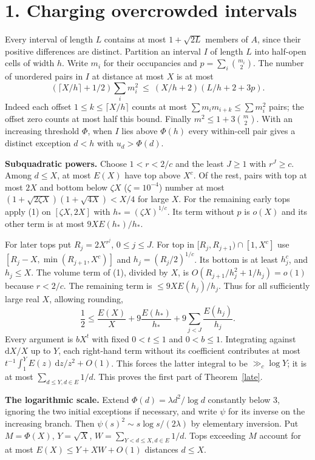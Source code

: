 \documentclass[10pt,a4paper]{article}
\newcommand{\rd}{\mathrm d}
\begin{document}
\section*{1. Charging overcrowded intervals}
Every interval of length $L$ contains at most $1+\sqrt{2L}$ members of $A$, since their positive differences are distinct. Partition an interval $I$ of length $L$ into half-open cells of width $h$. Write $m_i$ for their occupancies and $p=\sum_i\binom{m_i}{2}$. The number of unordered pairs in $I$ at distance at most $X$ is at most
\begin{equation}
 (\lceil X/h\rceil+1/2)\sum_i m_i^2
 \ \le\ (X/h+2)(L/h+2+3p).                                      \tag{1}
\end{equation}
Indeed each offset $1\le k\le\lceil X/h\rceil$ counts at most $\sum m_i m_{i+k}\le\sum m_i^2$ pairs; the offset zero counts at most half this bound. Finally $m^2\le1+3\binom m2$. With an increasing threshold $\Phi$, when $I$ lies above $\Phi(h)$ every within-cell pair gives a distinct exception $d<h$ with $u_d>\Phi(d)$.

\textbf{Subquadratic powers.} Choose $1<r<2/c$ and the least $J\ge1$ with $r^J\ge c$. Among $d\le X$, at most $E(X)$ have top above $X^c$. Of the rest, pairs with top at most $2X$ and bottom below $\zeta X$ ($\zeta=10^{-4}$) number at most $(1+\sqrt{2\zeta X})(1+\sqrt{4X})<X/4$ for large $X$. For the remaining early tops apply (1) on $[\zeta X,2X]$ with $h_*=(\zeta X)^{1/c}$. Its term without $p$ is $o(X)$ and its other term is at most $9X E(h_*)/h_*$.

For later tops put $R_j=2X^{r^j}$, $0\le j\le J$. For top in $[R_j,R_{j+1})\cap[1,X^c]$ use $[R_j-X,\min(R_{j+1},X^c)]$ and $h_j=(R_j/2)^{1/c}$. Its bottom is at least $h_j^c$, and $h_j\le X$. The volume term of (1), divided by $X$, is $O(R_{j+1}/h_j^2+1/h_j)=o(1)$ because $r<2/c$. The remaining term is $\le9XE(h_j)/h_j$. Thus for all sufficiently large real $X$, allowing rounding,
\[
 \frac12\le \frac{E(X)}X+9\frac{E(h_*)}{h_*}+9\sum_{j<J}\frac{E(h_j)}{h_j}.
\]
Every argument is $bX^t$ with fixed $0<t\le1$ and $0<b\le1$. Integrating against $\rd X/X$ up to $Y$, each right-hand term without its coefficient contributes at most $t^{-1}\int_1^Y E(z)\,\rd z/z^2+O(1)$. This forces the latter integral to be $\gg_c\log Y$; it is at most $\sum_{d\le Y,d\in E}1/d$. This proves the first part of Theorem~\ref{late}.

\textbf{The logarithmic scale.} Extend $\Phi(d)=\lambda d^2/\log d$ constantly below 3, ignoring the two initial exceptions if necessary, and write $\psi$ for its inverse on the increasing branch. Then
$\psi(s)^2\sim s\log s/(2\lambda)$ by elementary inversion. Put $M=\Phi(X)$, $Y=\sqrt X$, $W=\sum_{Y<d\le X,d\in E}1/d$. Tops exceeding $M$ account for at most $E(X)\le Y+XW+O(1)$ distances $d\le X$.
\end{document}
